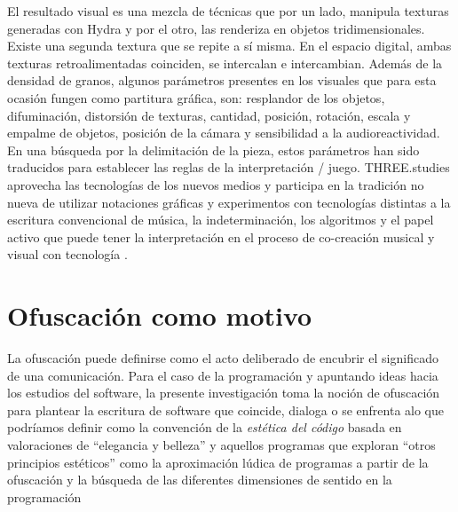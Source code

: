\documentclass[12pt,letterpaper, twoside, openright,
headinclude,footinclude,BCOR5mm,
numbers=noenddot,cleardoublepage=empty,
tablecaptionabove]{article}
\begin{document}
El resultado visual es una mezcla de técnicas que por un lado, manipula texturas generadas con Hydra y por el otro, las renderiza en objetos tridimensionales. Existe una segunda textura que se repite a sí misma. En el espacio digital, ambas texturas retroalimentadas coinciden, se intercalan e intercambian. Además de la densidad de granos, algunos parámetros presentes en los visuales que para esta ocasión fungen como partitura gráfica, son: resplandor de los objetos, difuminación, distorsión de texturas, cantidad, posición, rotación, escala y empalme de objetos, posición de la cámara y sensibilidad a la audioreactividad. En una búsqueda por la delimitación de la pieza, estos parámetros han sido traducidos para establecer las reglas de la interpretación / juego. THREE.studies aprovecha las tecnologías de los nuevos medios y participa en la tradición no nueva de utilizar notaciones gráficas y experimentos con tecnologías distintas a la escritura convencional de música, la indeterminación, los algoritmos y el papel activo que puede tener la interpretación en el proceso de co-creación musical y visual con tecnología \citep{magnussonSonic}. 







\section*{Ofuscación como motivo}


La ofuscación puede definirse como el acto deliberado de encubrir el significado de una comunicación. Para el caso de la programación y apuntando ideas hacia los estudios del software, la presente investigación toma la noción de ofuscación para plantear la escritura de software que coincide, dialoga o se enfrenta alo que podríamos definir como la convención de la \emph{estética del código} basada en valoraciones de ``elegancia y belleza''\citep[p.~10]{EWD:EWD35} y aquellos programas que exploran ``otros principios estéticos'' como la aproximación lúdica de programas a partir de la ofuscación y la búsqueda de las diferentes dimensiones de sentido en la programación\citep[p.~198]{obfuscatedCode}
\end{document}
